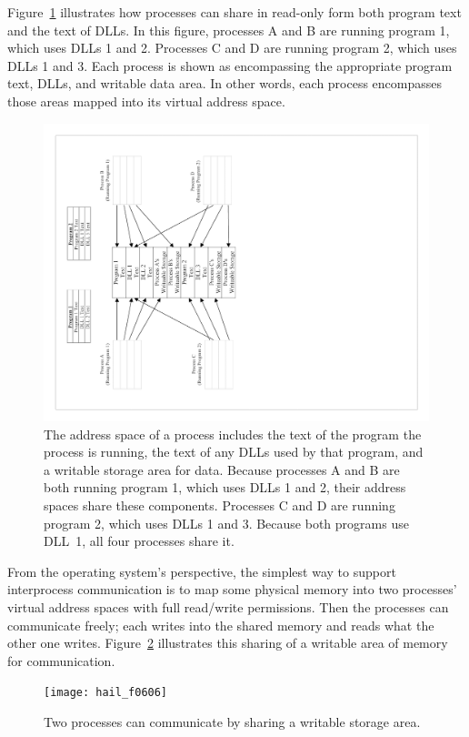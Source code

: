 Figure~\ref{scan-6-3} illustrates how processes can share in read-only
form both program text and the text of DLLs.  In this figure,
processes A and B are running program 1, which uses DLLs 1 and 2.
Processes C and D are running program 2, which uses DLLs 1 and 3.
Each process is shown as encompassing the appropriate program text,
DLLs, and writable data area.  In other words, each process encompasses
those areas mapped into its virtual address space.
\begin{figure}
\centerline{\includegraphics{hail_f0605}}
\caption{The address space of a process includes the text of the
  program the process is running, the text of any DLLs used by that
  program, and a writable storage area for data.  Because processes A and B are
  both running program 1, which uses DLLs 1 and 2, their address
  spaces share these components.  Processes C and D are running
  program 2, which uses DLLs 1 and 3.  Because both programs use
  DLL~1, all four processes share it.}
\label{scan-6-3}
\end{figure}


From the operating system's perspective, the simplest way to support
interprocess communication is to map some physical memory into two
processes' virtual address spaces with full read/write permissions.
Then the processes can communicate freely; each
writes into the shared memory and reads what the other one writes.
Figure~\ref{scan-6-4} illustrates this sharing of a writable
area of memory for communication.
\begin{figure}
\centerline{\texttt{[image: hail\_f0606]}}
\caption{Two processes can communicate by sharing a writable storage area.}
\label{scan-6-4}
\end{figure}

